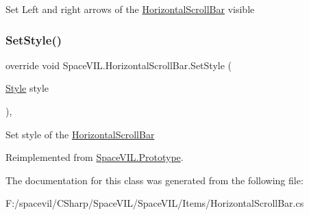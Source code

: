 Set Left and right arrows of the \mbox{\hyperlink{class_space_v_i_l_1_1_horizontal_scroll_bar}{Horizontal\+Scroll\+Bar}} visible 

\mbox{\label{class_space_v_i_l_1_1_horizontal_scroll_bar_ab871a5c2d291dadd8c902efd361079d5}} 
\subsubsection{\texorpdfstring{Set\+Style()}{SetStyle()}}
{\footnotesize\ttfamily override void Space\+V\+I\+L.\+Horizontal\+Scroll\+Bar.\+Set\+Style (\begin{DoxyParamCaption}\item[{\mbox{\hyperlink{class_space_v_i_l_1_1_decorations_1_1_style}{Style}}}]{style }\end{DoxyParamCaption})\hspace{0.3cm}{\ttfamily [inline]}, {\ttfamily [virtual]}}



Set style of the \mbox{\hyperlink{class_space_v_i_l_1_1_horizontal_scroll_bar}{Horizontal\+Scroll\+Bar}} 



Reimplemented from \mbox{\hyperlink{class_space_v_i_l_1_1_prototype_ae96644a6ace490afb376fb542161e541}{Space\+V\+I\+L.\+Prototype}}.



The documentation for this class was generated from the following file\+:\begin{DoxyCompactItemize}
\item 
F\+:/spacevil/\+C\+Sharp/\+Space\+V\+I\+L/\+Space\+V\+I\+L/\+Items/Horizontal\+Scroll\+Bar.\+cs\end{DoxyCompactItemize}
